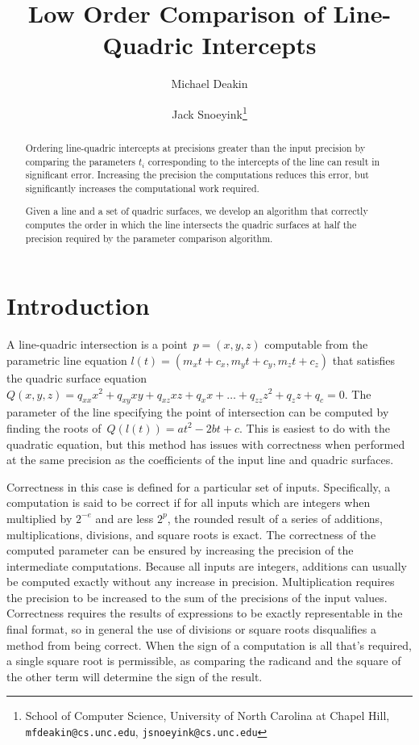 \documentclass{cccg16}
\title{Low Order Comparison of Line-Quadric Intercepts}
\author{Michael Deakin \and Jack Snoeyink\thanks{School of Computer
    Science, University of North Carolina at Chapel Hill, {\tt
      mfdeakin@cs.unc.edu}, {\tt jsnoeyink@cs.unc.edu}}}
\begin{document}
\thispagestyle{empty}
\maketitle

\begin{abstract}
Ordering line-quadric intercepts at precisions greater than the input
precision by comparing the parameters $t_i$ corresponding to the
intercepts of the line can result in significant error.  Increasing
the precision the computations reduces this error, but significantly
increases the computational work required.

Given a line and a set of quadric surfaces, we develop an algorithm
that correctly computes the order in which the line intersects the
quadric surfaces at half the precision required by the parameter
comparison algorithm.
\end{abstract}

\section{Introduction}
A line-quadric intersection is a point~$p=(x, y, z)$ computable from
the parametric line equation $l(t)=(m_x t + c_x, m_y t + c_y, m_z t +
c_z)$ that satisfies the quadric surface equation~$Q(x, y, z)=q_{xx}
x^2 + q_{xy} xy + q_{xz} xz + q_x x + \dots + q_{zz} z^2 + q_{z} z +
q_c = 0$.  The parameter of the line specifying the point of
intersection can be computed by finding the roots of~$Q(l(t))=a t^2 -
2 b t + c$.  This is easiest to do with the quadratic equation, but
this method has issues with correctness when performed at the same
precision as the coefficients of the input line and quadric surfaces.

Correctness in this case is defined for a particular set of inputs.
Specifically, a computation is said to be correct if for all inputs
which are integers when multiplied by $2^{-e}$ and are less $2^p$, the
rounded result of a series of additions, multiplications, divisions,
and square roots is exact.  The correctness of the computed parameter
can be ensured by increasing the precision of the intermediate
computations.  Because all inputs are integers, additions can usually
be computed exactly without any increase in precision.  Multiplication
requires the precision to be increased to the sum of the precisions of
the input values.
Correctness requires the results of expressions to be exactly
representable in the final format, so in general the use of divisions
or square roots disqualifies a method from being correct.
When the sign of a computation is all that's required, a single square
root is permissible, as comparing the radicand and the square of the
other term will determine the sign of the result.
\end{document}
